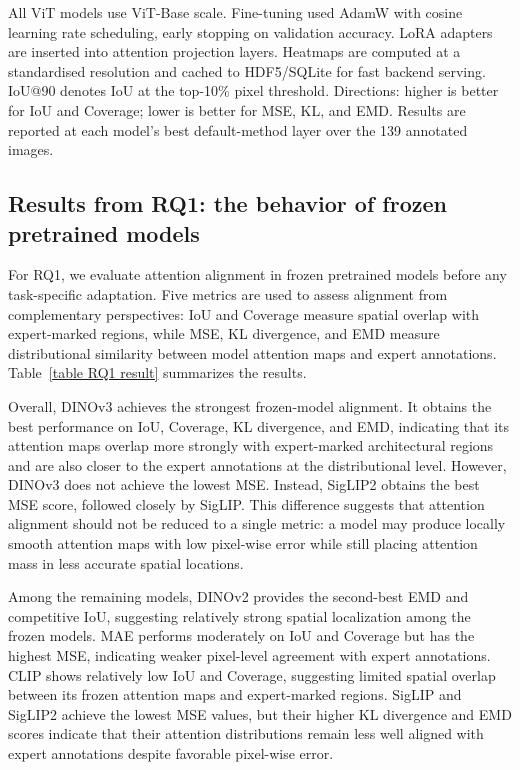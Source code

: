 \documentclass[lineno,pdflatex,sn-mathphys-num]{sn-jnl}%
\theoremstyle{thmstyleone}%
\theoremstyle{thmstyletwo}%
\theoremstyle{thmstylethree}%
\begin{document}
All ViT models use ViT-Base scale. Fine-tuning used AdamW with cosine learning rate scheduling, early stopping on validation accuracy. LoRA adapters are inserted into attention projection layers. Heatmaps are computed at a standardised resolution and cached to HDF5/SQLite for fast backend serving. IoU@90 denotes IoU at the top-10\% pixel threshold. Directions: higher is better for IoU and Coverage; lower is better for MSE, KL, and EMD. Results are reported at each model's best default-method layer over the 139 annotated images.

\subsection{Results from RQ1: the behavior of frozen pretrained models}

For RQ1, we evaluate attention alignment in frozen pretrained models before any task-specific adaptation. Five metrics are used to assess alignment from complementary perspectives: IoU and Coverage measure spatial overlap with expert-marked regions, while MSE, KL divergence, and EMD measure distributional similarity between model attention maps and expert annotations. Table~\ref{table RQ1 result} summarizes the results.

Overall, DINOv3 achieves the strongest frozen-model alignment. It obtains the best performance on IoU, Coverage, KL divergence, and EMD, indicating that its attention maps overlap more strongly with expert-marked architectural regions and are also closer to the expert annotations at the distributional level. However, DINOv3 does not achieve the lowest MSE. Instead, SigLIP2 obtains the best MSE score, followed closely by SigLIP. This difference suggests that attention alignment should not be reduced to a single metric: a model may produce locally smooth attention maps with low pixel-wise error while still placing attention mass in less accurate spatial locations.

Among the remaining models, DINOv2 provides the second-best EMD and competitive IoU, suggesting relatively strong spatial localization among the frozen models. MAE performs moderately on IoU and Coverage but has the highest MSE, indicating weaker pixel-level agreement with expert annotations. CLIP shows relatively low IoU and Coverage, suggesting limited spatial overlap between its frozen attention maps and expert-marked regions. SigLIP and SigLIP2 achieve the lowest MSE values, but their higher KL divergence and EMD scores indicate that their attention distributions remain less well aligned with expert annotations despite favorable pixel-wise error.
\end{document}

